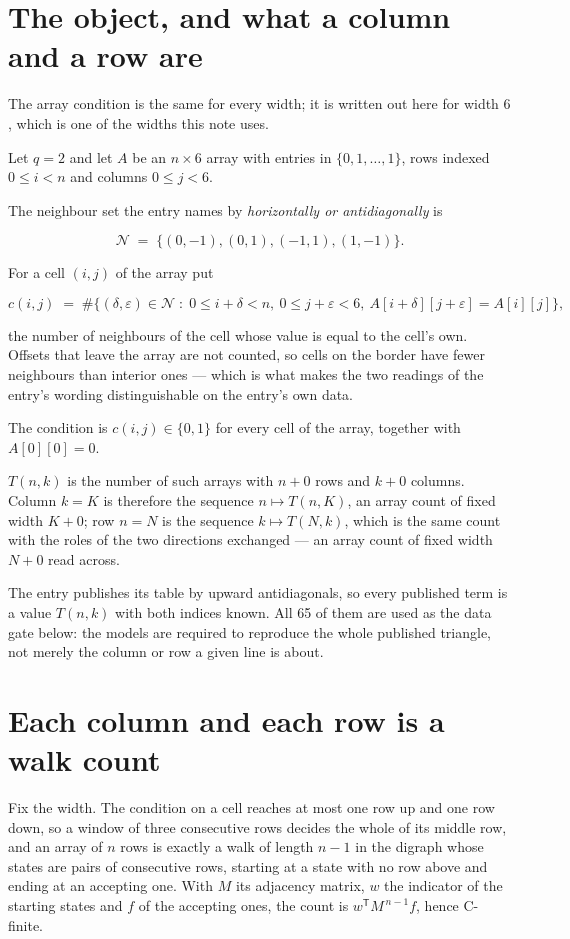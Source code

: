 \documentclass[11pt]{article}
\theoremstyle{definition}
\begin{document}
\section{The object, and what a column and a row are}

The array condition is the same for every width; it is written out here for width $6$, which is one of the widths this note uses.

Let $q = 2$ and let $A$ be an $n \times 6$ array with entries in $\{0,1,\dots,1\}$, rows indexed $0 \le i < n$ and columns $0 \le j < 6$.

The neighbour set the entry names by {\itshape horizontally or antidiagonally} is

\[\mathcal{N} \;=\; \{(0,-1), (0,1), (-1,1), (1,-1)\}.\]

For a cell $(i,j)$ of the array put

\[c(i,j) \;=\; \#\bigl\{(\delta,\varepsilon)\in\mathcal{N} \;:\; 0\le i+\delta<n,\ 0\le j+\varepsilon<6,\ A[i+\delta][j+\varepsilon] = A[i][j]\bigr\},\]

the number of neighbours of the cell whose value is equal to the cell's own. Offsets that leave the array are not counted, so cells on the border have fewer neighbours than interior ones --- which is what makes the two readings of the entry's wording distinguishable on the entry's own data.

The condition is $c(i,j) \in \{0, 1\}$ for every cell of the array, together with $A[0][0]=0$.

$T(n,k)$ is the number of such arrays with $n + 0$ rows and $k + 0$ columns. Column $k = K$ is therefore the sequence $n \mapsto T(n,K)$, an array count of fixed width $K + 0$; row $n = N$ is the sequence $k \mapsto T(N,k)$, which is the same count with the roles of the two directions exchanged --- an array count of fixed width $N + 0$ read across.

The entry publishes its table by upward antidiagonals, so every published term is a value $T(n,k)$ with both indices known. All 65 of them are used as the data gate below: the models are required to reproduce the whole published triangle, not merely the column or row a given line is about.

\section{Each column and each row is a walk count}

Fix the width. The condition on a cell reaches at most one row up and one row down, so a window of three consecutive rows decides the whole of its middle row, and an array of $n$ rows is exactly a walk of length $n-1$ in the digraph whose states are pairs of consecutive rows, starting at a state with no row above and ending at an accepting one. With $M$ its adjacency matrix, $w$ the indicator of the starting states and $f$ of the accepting ones, the count is $w^{\mathsf T}M^{\,n-1}f$, hence C-finite.
\end{document}
